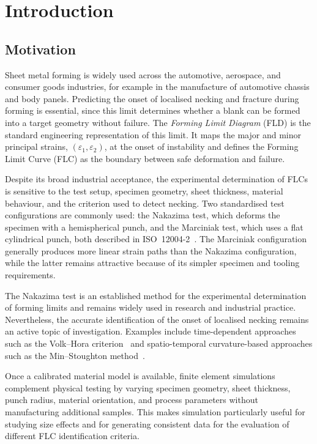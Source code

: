 \chapter{Introduction}\label{chap:introduction}

\section{Motivation}

Sheet metal forming is widely used across the automotive, aerospace, and
consumer goods industries, for example in the manufacture of automotive
chassis and body panels. Predicting the onset of localised necking and
fracture during forming is essential, since this limit determines whether a
blank can be formed into a target geometry without failure. The
\textit{Forming Limit Diagram} (FLD) is the standard engineering
representation of this limit. It maps the major and minor principal strains,
$(\varepsilon_1,\varepsilon_2)$, at the onset of instability and defines the
Forming Limit Curve (FLC) as the boundary between safe deformation and failure.

Despite its broad industrial acceptance, the experimental determination of
FLCs is sensitive to the test setup, specimen geometry, sheet thickness,
material behaviour, and the criterion used to detect necking. Two standardised
test configurations are commonly used: the Nakazima test, which deforms the
specimen with a hemispherical punch, and the Marciniak test, which uses a flat
cylindrical punch, both described in ISO~12004-2~\cite{ISO120042}. The
Marciniak configuration generally produces more linear strain paths than the
Nakazima configuration, while the latter remains attractive because of its
simpler specimen and tooling requirements.

The Nakazima test is an established method for the experimental
determination of forming limits and remains widely used in research and
industrial practice. Nevertheless, the accurate identification of the onset of
localised necking remains an active topic of investigation. Examples include
time-dependent approaches such as the Volk--Hora criterion~\cite{VolkHora2011}
and spatio-temporal curvature-based approaches such as the Min--Stoughton
method~\cite{Min2017}.

Once a calibrated material model is available, finite element simulations
complement physical testing by varying specimen geometry, sheet thickness,
punch radius, material orientation, and process parameters without
manufacturing additional samples. This makes simulation particularly useful
for studying size effects and for generating consistent data for the
evaluation of different FLC identification criteria.

